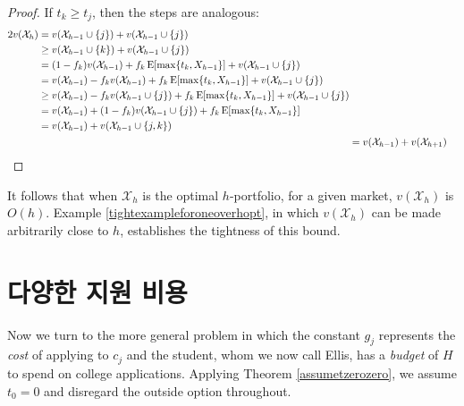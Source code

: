 \documentclass[12pt]{article} %
\newif\ifen
\theoremstyle{definition}
\newtheorem{example}{Example}
\theoremstyle{definition}
\newtheorem{example}{예}
\begin{document}
\begin{proof}
If $t_k \geq t_j$, then the steps are analogous:
\begin{align}
\begin{split}
2 v(\mathcal{X}_h) &= v(\mathcal{X}_{h-1} \cup\{j\}) + v(\mathcal{X}_{h-1} \cup\{j\}) \\
&\geq v(\mathcal{X}_{h-1} \cup\{k\}) + v(\mathcal{X}_{h-1} \cup\{j\}) \\
&= (1 - f_k) v(\mathcal{X}_{h-1}) + f_k \operatorname{E}[\max\{t_k, X_{h-1}\}] +  v(\mathcal{X}_{h-1} \cup\{j\})  \\
&= v(\mathcal{X}_{h-1}) - f_k  v(\mathcal{X}_{h-1}) + f_k \operatorname{E}[\max\{t_k, X_{h-1}\}] +  v(\mathcal{X}_{h-1} \cup\{j\})  \\
&\geq v(\mathcal{X}_{h-1}) - f_k  v(\mathcal{X}_{h-1}\cup\{j\}) + f_k \operatorname{E}[\max\{t_k, X_{h-1}\}] +  v(\mathcal{X}_{h-1} \cup\{j\})  \\
&= v(\mathcal{X}_{h-1}) + (1 - f_k) v(\mathcal{X}_{h-1}\cup\{j\}) + f_k \operatorname{E}[\max\{t_k, X_{h-1}\}]  \\
&= v(\mathcal{X}_{h-1}) + v(\mathcal{X}_{h-1} \cup\{j, k\})
\end{split}\\
&= v(\mathcal{X}_{h-1})  + v(\mathcal{X}_{h+1}) \qedhere
\end{align}
\end{proof}

It follows that when $\mathcal{X}_h$ is the optimal $h$-portfolio, for a given market, $v(\mathcal{X}_h)$ is $O(h)$. Example \ref{tightexampleforoneoverhopt}, in which $v(\mathcal{X}_h)$ can be made arbitrarily close to $h$, establishes the tightness of this bound.










\pagebreak
\ifen \section{Heterogeneous application costs} \else\section{다양한 지원 비용} \fi\label{hetappcosts}
Now we turn to the more general problem in which the constant $g_j$ represents the \emph{cost} of applying to $c_j$ and the student, whom we now call Ellis, has a \emph{budget} of $H$ to spend on college applications.  Applying Theorem \ref{assumetzerozero}, we assume $t_0 = 0$ and disregard the outside option throughout.
\end{document}
